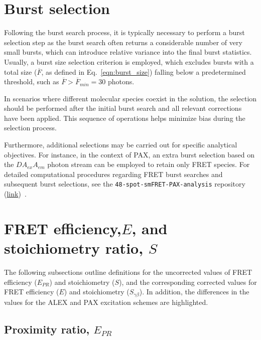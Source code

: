 \section{Burst selection}
\label{sec:burst_selection_apdx}

Following the burst search process, it is typically necessary to perform a burst selection step as the burst search often returns a considerable number of very small bursts, which can introduce relative variance into the final burst statistics.
Usually, a burst size selection criterion is employed, which excludes bursts with a total size ($\overline{F}$, as defined in Eq.~\ref{eqn:burst_size}) falling below a predetermined threshold, such as $\overline{F} > \overline{F}_{min} = 30$ photons.

In scenarios where different molecular species coexist in the solution, the selection should be performed after the initial burst search and all relevant corrections have been applied. 
This sequence of operations helps minimize bias during the selection process.

Furthermore, additional selections may be carried out for specific analytical objectives. 
For instance, in the context of \ac{PAX}, an extra burst selection based on the $DA_{ex}A_{em}$ photon stream can be employed to retain only FRET species. For detailed computational procedures regarding FRET burst searches and subsequent burst selections, see the \texttt{48-spot-smFRET-PAX-analysis} repository (\href{https://github.com/tritemio/48-spot-smFRET-PAX-analysis}{link})~\cite{ingargiola_JCP_2018}.

\section{FRET efficiency,$E$, and stoichiometry ratio, $S$}
\label{sec:ratiometric_E_S_apdx}

The following subsections outline definitions for the uncorrected values of FRET efficiency ($E_{PR}$) and stoichiometry ($S$), and the corresponding corrected values for FRET efficiency ($E$) and stoichiometry ($S_{\gamma\beta}$).
In addition, the differences in the values for the \ac{ALEX} and \ac{PAX} excitation schemes are highlighted.

\subsection{Proximity ratio, $E_{PR}$}
\label{sec:Epr_apdx}

